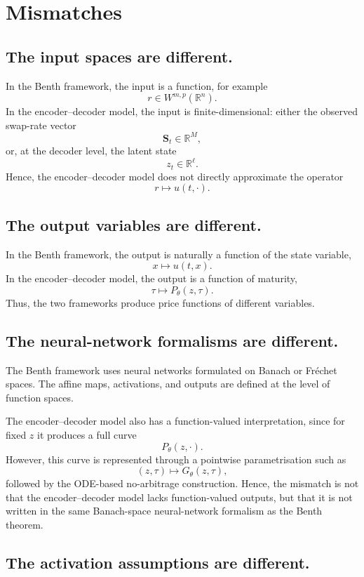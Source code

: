 \section{Mismatches}

\subsection{The input spaces are different.}

In the Benth framework, the input is a function, for example
\[
    r\in W^{m,p}(\mathbb R^n).
\]
In the encoder--decoder model, the input is finite-dimensional: either the observed
swap-rate vector
\[
    \mathbf S_t\in\mathbb R^M,
\]
or, at the decoder level, the latent state
\[
    z_t\in\mathbb R^\ell.
\]
Hence, the encoder--decoder model does not directly approximate the operator
\[
    r\mapsto u(t,\cdot).
\]

\subsection{The output variables are different.}

In the Benth framework, the output is naturally a function of the state variable,
\[
    x\mapsto u(t,x).
\]
In the encoder--decoder model, the output is a function of maturity,
\[
    \tau\mapsto P_\theta(z,\tau).
\]
Thus, the two frameworks produce price functions of different variables.

\subsection{The neural-network formalisms are different.}

The Benth framework uses neural networks formulated on Banach or Fréchet spaces.
The affine maps, activations, and outputs are defined at the level of function
spaces.

The encoder--decoder model also has a function-valued interpretation, since for fixed
\(z\) it produces a full curve
\[
    P_\theta(z,\cdot).
\]
However, this curve is represented through a pointwise parametrisation such as
\[
    (z,\tau)\mapsto G_\theta(z,\tau),
\]
followed by the ODE-based no-arbitrage construction. Hence, the mismatch is not that
the encoder--decoder model lacks function-valued outputs, but that it is not written
in the same Banach-space neural-network formalism as the Benth theorem.

\subsection{The activation assumptions are different.}

